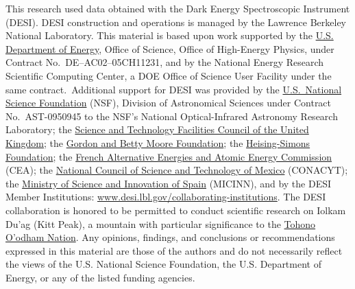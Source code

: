 \documentclass[fleqn,usenatbib]{mnras}
\begin{document}
This research used data obtained with the Dark Energy Spectroscopic Instrument (DESI).
DESI construction and operations is managed by the Lawrence Berkeley National Laboratory.
This material is based upon work supported by the \href{https://www.energy.gov/}{U.S. Department of Energy}, Office of Science, Office of High-Energy Physics, under Contract No.\ DE--AC02--05CH11231, and by the National Energy Research Scientific Computing Center, a DOE Office of Science User Facility under the same contract.\
Additional support for DESI was provided by the \href{https://www.nsf.gov/}{U.S.\ National Science Foundation} (NSF), Division of Astronomical Sciences under Contract No.\ AST-0950945 to the NSF's National Optical-Infrared Astronomy Research Laboratory;
the \href{https://stfc.ukri.org/}{Science and Technology Facilities Council of the United Kingdom};
the \href{https://www.moore.org/}{Gordon and Betty Moore Foundation};
the \href{https://www.hsfoundation.org/}{Heising-Simons Foundation};
the \href{http://www.cea.fr/}{French Alternative Energies and Atomic Energy Commission} (CEA);
the \href{https://www.conacyt.gob.mx/}{National Council of Science and Technology of Mexico} (CONACYT);
the \href{http://www.mineco.gob.es/}{Ministry of Science and Innovation of Spain} (MICINN), and by the DESI Member Institutions: \url{www.desi.lbl.gov/collaborating-institutions}.
The DESI collaboration is honored to be permitted to conduct scientific research on Iolkam Du'ag (Kitt Peak), a mountain with particular significance to the \href{http://www.tonation-nsn.gov/}{Tohono O'odham Nation}.
Any opinions, findings, and conclusions or recommendations expressed in this material are those of the authors and do not necessarily reflect the views of the U.S. National Science Foundation, the U.S. Department of Energy, or any of the listed funding agencies.
\end{document}
